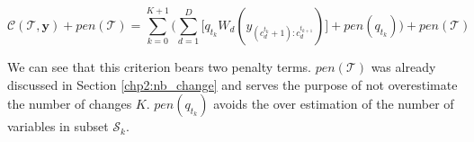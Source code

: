 \begin{equation}\label{chp:2:optnKnownmulti}
\mathcal{C}(\mathcal{T},\bm y) + pen(\mathcal{T}) = \sum_{k = 0}^{K+1}\bigg(\sum_{d=1}^D \bigg[ q_{t_k}W_d(y_{(c^{t_k}_d+1):c^{t_{k+1}}_d})\bigg] + pen(q_{t_k}) \bigg) + pen(\mathcal{T})
\end{equation}      

We can see that this criterion bears two penalty terms. $pen(\mathcal{T})$ was already discussed in Section \ref{chp2:nb_change} and serves the purpose of not overestimate the number of changes $K$. $pen(q_{t_k})$ avoids the over estimation of the number of variables in subset $\mathcal{S}_k$. 



